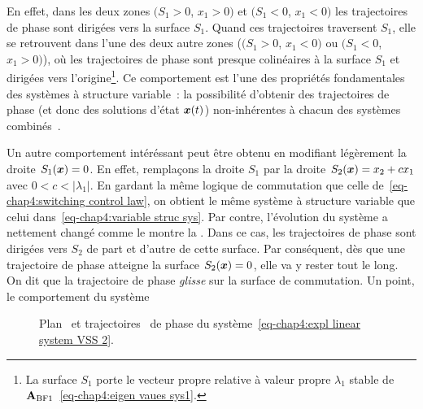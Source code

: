 En effet, dans les deux zones $(S_1>0$, $x_1>0)$ et $(S_1<0$, $x_1<0)$ les trajectoires de phase sont dirigées vers la surface $S_1$. Quand ces trajectoires traversent $S_1$, elle se retrouvent dans l'une des deux autre zones ($(S_1>0$, $x_1<0)$ ou $(S_1<0$, $x_1>0)$), où les trajectoires de phase sont  presque colinéaires à la surface $S_1$ et dirigées vers l'origine\footnote{La surface $S_1$ porte le vecteur propre relative à valeur propre $\lambda_1$ stable de $\mathbf{A}_{\rm BF 1}$~\eqref{eq-chap4:eigen vaues sys1}.}. Ce comportement est l'une des propriétés fondamentales des systèmes à structure variable~: la possibilité d'obtenir des trajectoires de phase (et donc des solutions d'état $\bm{x}(t)$) non-inhérentes à chacun des systèmes combinés~\cite{utkin17tac}.

Un autre comportement intéréssant peut être obtenu en modifiant légèrement la droite $S_1(\bm{x})=0$. En effet, remplaçons la droite $S_1$ par la droite $S_2(\bm{x})= x_2 + cx_1$ avec $0<c<|\lambda_1|$. En gardant la même logique de commutation que celle de~\eqref{eq-chap4:switching control law}, on obtient le même système à structure variable que celui dans~\eqref{eq-chap4:variable struc sys}. Par contre, l'évolution du système a nettement changé comme le montre la . Dans ce cas, les trajectoires de phase sont dirigées vers $S_2$ de part et d'autre de cette surface. Par conséquent, dès que une trajectoire de phase atteigne la surface $S_2(\bm{x})=0$, elle va y rester tout le long. On dit que la trajectoire de phase \emph{glisse} sur la surface de commutation. Un point, le comportement du système
\begin{figure}
	\centering
	\caption{Plan~ et trajectoires~ de phase du système~\eqref{eq-chap4:expl linear system VSS 2}.}
	\label{fig:sys2}
\end{figure}
